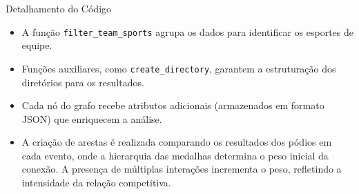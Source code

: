\begin{frame}{Detalhamento do Código}
\begin{itemize}[<+->]
    \item A função \texttt{filter\_team\_sports} agrupa os dados para identificar os esportes de equipe.
    \item Funções auxiliares, como \texttt{create\_directory}, garantem a estruturação dos diretórios para os resultados.
    \item Cada nó do grafo recebe atributos adicionais (armazenados em formato JSON) que enriquecem a análise.
    \item A criação de arestas é realizada comparando os resultados dos pódios em cada evento, onde a hierarquia das medalhas determina o peso inicial da conexão. A presença de múltiplas interações incrementa o peso, refletindo a intensidade da relação competitiva.
\end{itemize}
\end{frame}

    
    
    
        
        


